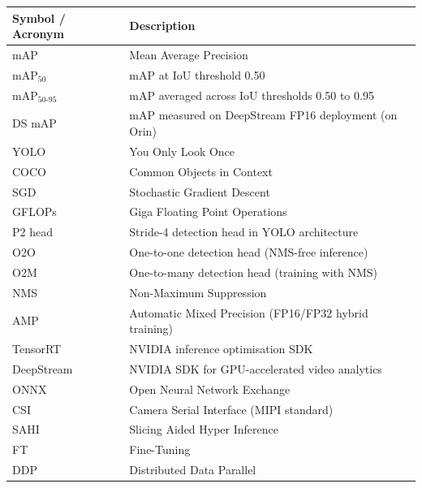 \documentclass[12pt, titlepage]{article}
\begin{document}
\renewcommand{\arraystretch}{1.2}
\begin{tabular}{l l}
  \toprule
  \textbf{Symbol / Acronym} & \textbf{Description}                                  \\
  \midrule
  mAP                       & Mean Average Precision                                \\
  mAP$_{50}$                & mAP at IoU threshold 0.50                             \\
  mAP$_{50\text{-}95}$      & mAP averaged across IoU thresholds 0.50 to 0.95       \\
  DS mAP                    & mAP measured on DeepStream FP16 deployment (on Orin)  \\
  YOLO                      & You Only Look Once                                    \\
  COCO                      & Common Objects in Context                             \\
  SGD                       & Stochastic Gradient Descent                           \\
  GFLOPs                    & Giga Floating Point Operations                        \\
  P2 head                   & Stride-4 detection head in YOLO architecture          \\
  O2O                       & One-to-one detection head (NMS-free inference)        \\
  O2M                       & One-to-many detection head (training with NMS)        \\
  NMS                       & Non-Maximum Suppression                               \\
  AMP                       & Automatic Mixed Precision (FP16/FP32 hybrid training) \\
  TensorRT                  & NVIDIA inference optimisation SDK                     \\
  DeepStream                & NVIDIA SDK for GPU-accelerated video analytics        \\
  ONNX                      & Open Neural Network Exchange                          \\
  CSI                       & Camera Serial Interface (MIPI standard)               \\
  SAHI                      & Slicing Aided Hyper Inference                         \\
  FT                        & Fine-Tuning                                           \\
  DDP                       & Distributed Data Parallel                             \\
  \bottomrule
\end{tabular}\\
\end{document}

